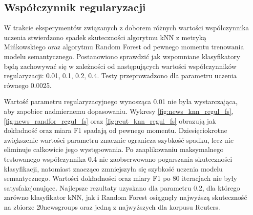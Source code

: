 \documentclass{pracamgr}
\begin{document}
\begin{table}[]
\centering
{}
\caption{Porównanie najlepszych wyników klasyfikacji ze względu na metodę obliczania wagi i współczynnik uczenia}
\label{weight_tab}
\end{table}

\subsection{Współczynnik regularyzacji}

W trakcie eksperymentów związanych z doborem różnych wartości współczynnika uczenia stwierdzono spadek skuteczności algorytmu kNN z metryką Mińkowskiego oraz algorytmu Random Forest od pewnego momentu trenowania modelu semantycznego. Postanowiono sprawdzić jak wspomniane klasyfikatory będą zachowywać się w zależności od następujących wartości współczynników regularyzacji: 0.01, 0.1, 0.2, 0.4. Testy przeprowadzono dla parametru uczenia równego 0.0025. 

Wartość parametru regularyzacyjnego wynosząca 0.01 nie była wystarczająca, aby zapobiec nadmiernemu dopasowaniu. Wykresy \ref{fig:news_knn_regul_fs}, \ref{fig:news_randfor_regul_fs} oraz \ref{fig:reut_knn_regul_fs} obrazują jak dokładność oraz miara F1 spadają od pewnego momentu. Dziesięciokrotne zwiększenie wartości parametru znacznie ogranicza szybkość spadku, lecz nie eliminuje całkowicie jego występowania. Po zaaplikowaniu maksymalnego testowanego współczynnika 0.4 nie zaobserwowano pogarszania skuteczności klasyfikacji, natomiast znacząco zmniejszyła się szybkość uczenia modelu semantycznego. Wartości dokładności oraz miary F1 po 80 iteracjach nie były satysfakcjonujące. Najlepsze rezultaty uzyskano dla parametru 0.2, dla którego zarówno klasyfikator kNN, jak i Random Forest osiągnęły najwyższą skuteczność na zbiorze 20newsgroups oraz jedną z najwyższych dla korpusu Reuters.
\end{document}
